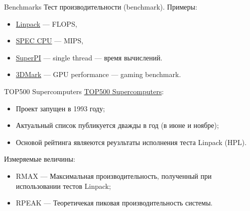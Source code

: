 \begin{frame}{Benchmarks}
Тест производительности (\abbr benchmark).
\vfill
Примеры:
\begin{itemize}
    \item \href{http://www.netlib.org/utk/people/JackDongarra/faq-linpack.html}{Linpack} --- FLOPS,
    \item \href{http://www.spec.org/benchmarks.html}{SPEC CPU} --- MIPS,
    \item \href{http://www.superpi.net}{SuperPI} --- single thread --- время вычислений.
    \item \href{http://www.3dmark.com/}{3DMark} --- GPU performance --- gaming benchmark.
\end{itemize}
\end{frame}

\begin{frame}{TOP500 Supercomputers}
\href{http://top500.org/}{TOP500 Supercomputers}:
\begin{itemize}
    \item Проект запущен в 1993 году;
    \item Актуальный список публикуется дважды в год (в июне и ноябре);
    \item Основой рейтинга являеются реузльтаты исполнения теста Linpack (HPL).
\end{itemize}
\vfill
Измеряемые величины:
\begin{itemize}
    \item RMAX --- Максимальная производительность, полученный при использовании
    тестов Linpack;
    \item RPEAK --- Теоретичекая пиковая производительность системы.
\end{itemize}
\end{frame}

